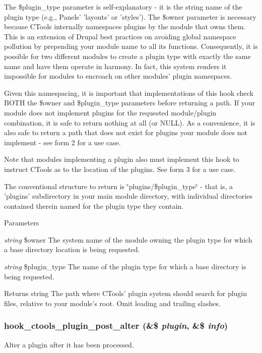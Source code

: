 The \$plugin\_\-type parameter is self-\/explanatory -\/ it is the string name of the plugin type (e.g., Panels' 'layouts' or 'styles'). The \$owner parameter is necessary because CTools internally namespaces plugins by the module that owns them. This is an extension of Drupal best practices on avoiding global namespace pollution by prepending your module name to all its functions. Consequently, it is possible for two different modules to create a plugin type with exactly the same name and have them operate in harmony. In fact, this system renders it impossible for modules to encroach on other modules' plugin namespaces.

Given this namespacing, it is important that implementations of this hook check BOTH the \$owner and \$plugin\_\-type parameters before returning a path. If your module does not implement plugins for the requested module/plugin combination, it is safe to return nothing at all (or NULL). As a convenience, it is also safe to return a path that does not exist for plugins your module does not implement -\/ see form 2 for a use case.

Note that modules implementing a plugin also must implement this hook to instruct CTools as to the location of the plugins. See form 3 for a use case.

The conventional structure to return is \char`\"{}plugins/\$plugin\_\-type\char`\"{} -\/ that is, a 'plugins' subdirectory in your main module directory, with individual directories contained therein named for the plugin type they contain.


\begin{DoxyParams}{Parameters}
\item[{\em string}]\$owner The system name of the module owning the plugin type for which a base directory location is being requested. \item[{\em string}]\$plugin\_\-type The name of the plugin type for which a base directory is being requested. \end{DoxyParams}
\begin{DoxyReturn}{Returns}
string The path where CTools' plugin system should search for plugin files, relative to your module's root. Omit leading and trailing slashes. 
\end{DoxyReturn}
\hypertarget{group__hooks_ga2f8a7bad70a9bcb0748a13463a32d362}{
\subsubsection[{hook\_\-ctools\_\-plugin\_\-post\_\-alter}]{\setlength{\rightskip}{0pt plus 5cm}hook\_\-ctools\_\-plugin\_\-post\_\-alter (\&\$ {\em plugin}, \/  \&\$ {\em info})}}
\label{group__hooks_ga2f8a7bad70a9bcb0748a13463a32d362}
Alter a plugin after it has been processed.

